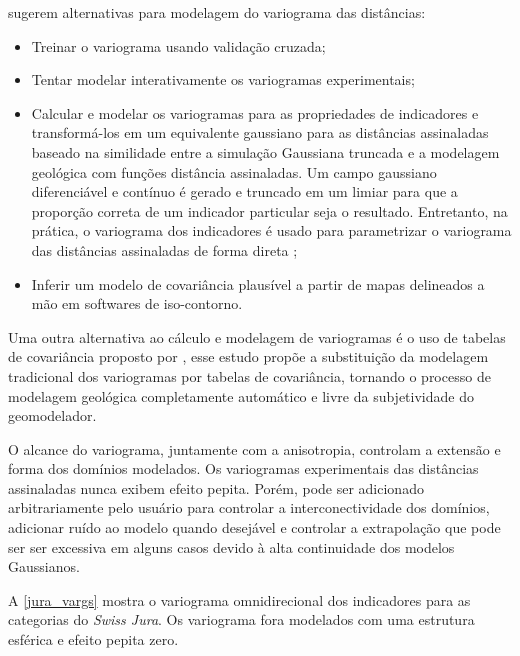  sugerem alternativas para modelagem do variograma das distâncias:

\begin{itemize}
    \item Treinar o variograma usando validação cruzada;
    \item Tentar modelar interativamente os variogramas experimentais;
    \item Calcular e modelar os variogramas para as propriedades de indicadores e transformá-los em um equivalente gaussiano para as distâncias assinaladas baseado na similidade entre a simulação Gaussiana truncada e a modelagem geológica com funções distância assinaladas. Um campo gaussiano diferenciável e contínuo é gerado e truncado em um limiar para que a proporção correta de um indicador particular seja o resultado. Entretanto, na prática, o variograma dos indicadores é usado para parametrizar o variograma das distâncias assinaladas de forma direta \cite{martin2017implicitmodeling};
    \item Inferir um modelo de covariância plausível a partir de mapas delineados a mão em softwares de iso-contorno.
\end{itemize}

Uma outra alternativa ao cálculo e modelagem de variogramas é o uso de tabelas de covariância proposto por , esse estudo propõe a substituição da modelagem tradicional dos variogramas por tabelas de covariância, tornando o processo de modelagem geológica completamente automático e livre da subjetividade do geomodelador.

O alcance do variograma, juntamente com a anisotropia, controlam a extensão e forma dos domínios modelados. Os variogramas experimentais das distâncias assinaladas nunca exibem efeito pepita. Porém, pode ser adicionado arbitrariamente pelo usuário para controlar a interconectividade dos domínios, adicionar ruído ao modelo quando desejável e controlar a extrapolação que pode ser ser excessiva em alguns casos devido à alta continuidade dos modelos Gaussianos.

A \autoref{jura_vargs} mostra o variograma omnidirecional dos indicadores para as categorias do \textit{Swiss Jura}. Os variograma fora modelados com uma estrutura esférica e efeito pepita zero.

